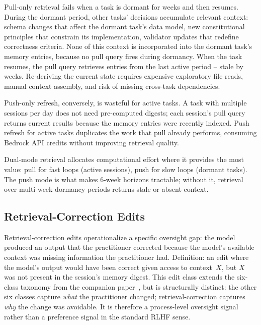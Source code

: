 \documentclass[11pt]{article}
\begin{document}
Pull-only retrieval fails when a task is dormant for weeks and then resumes.
During the dormant period, other tasks' decisions accumulate relevant context: schema changes that affect the dormant task's data model, new constitutional principles that constrain its implementation, validator updates that redefine correctness criteria.
None of this context is incorporated into the dormant task's memory entries, because no pull query fires during dormancy.
When the task resumes, the pull query retrieves entries from the last active period -- stale by weeks.
Re-deriving the current state requires expensive exploratory file reads, manual context assembly, and risk of missing cross-task dependencies.

Push-only refresh, conversely, is wasteful for active tasks.
A task with multiple sessions per day does not need pre-computed digests; each session's pull query returns current results because the memory entries were recently indexed.
Push refresh for active tasks duplicates the work that pull already performs, consuming Bedrock API credits without improving retrieval quality.

Dual-mode retrieval allocates computational effort where it provides the most value: pull for fast loops (active sessions), push for slow loops (dormant tasks).
The push mode is what makes 6-week horizons tractable; without it, retrieval over multi-week dormancy periods returns stale or absent context.

\subsection{Retrieval-Correction Edits}
\label{sec:retrieval-correction}

Retrieval-correction edits operationalize a specific oversight gap: the model produced an output that the practitioner corrected because the model's available context was missing information the practitioner had.
Definition: an edit where the model's output would have been correct given access to context~$X$, but $X$ was not present in the session's memory digest.
This edit class extends the six-class taxonomy from the companion paper~\citep[\S4]{ovcharov2026recursive}, but is structurally distinct: the other six classes capture \emph{what} the practitioner changed; retrieval-correction captures \emph{why} the change was avoidable.
It is therefore a process-level oversight signal rather than a preference signal in the standard RLHF sense.
\end{document}

